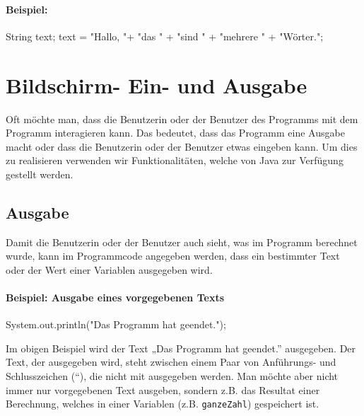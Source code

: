 \documentclass[10pt,paper=17cm:22cm, twoside=true, DIV=14]{scrbook}
\newenvironment {Shaded}
        {\begin{mdframed}[style=code] }
         {\end{mdframed}}
\newcommand{\StringTok}[1]{\textcolor[rgb]{0.4,0.4,0.4}{{#1}}}
\newcommand{\FunctionTok}[1]{\textcolor[rgb]{0.2,0.2,0.2}{#1}}
\newcommand{\NormalTok}[1]{#1}
\begin{document}
\paragraph{Beispiel:}\label{beispiel-18}

\begin{Shaded}
\begin{Highlighting}[]
\NormalTok{String text;}
\NormalTok{text = }\StringTok{"Hallo, "}\NormalTok{+ }\StringTok{"das "} \NormalTok{+ }\StringTok{"sind "} \NormalTok{+ }\StringTok{"mehrere "} \NormalTok{+ }\StringTok{"Wörter."}\NormalTok{;}
\end{Highlighting}
\end{Shaded}

\section{Bildschirm- Ein- und
Ausgabe}\label{bildschirm--ein--und-ausgabe-1}

Oft möchte man, dass die Benutzerin oder der Benutzer des Programms mit
dem Programm interagieren kann. Das bedeutet, dass das Programm eine
Ausgabe macht oder dass die Benutzerin oder der Benutzer etwas eingeben
kann. Um dies zu realisieren verwenden wir Funktionalitäten, welche von
Java zur Verfügung gestellt werden.

\subsection{Ausgabe}\label{ausgabe-1}

Damit die Benutzerin oder der Benutzer auch sieht, was im Programm
berechnet wurde, kann im Programmcode angegeben werden, dass ein
bestimmter Text oder der Wert einer Variablen ausgegeben wird.

\paragraph{Beispiel: Ausgabe eines vorgegebenen
Texts}\label{beispiel-ausgabe-eines-vorgegebenen-texts-1}

\begin{Shaded}
\begin{Highlighting}[]
\NormalTok{System.}\FunctionTok{out}\NormalTok{.}\FunctionTok{println}\NormalTok{(}\StringTok{"Das Programm hat geendet."}\NormalTok{);}
\end{Highlighting}
\end{Shaded}

Im obigen Beispiel wird der Text „Das Programm hat geendet.''
ausgegeben. Der Text, der ausgegeben wird, steht zwischen einem Paar von
Anführungs- und Schlusszeichen (``), die nicht mit ausgegeben werden.
Man möchte aber nicht immer nur vorgegebenen Text ausgeben, sondern z.B.
das Resultat einer Berechnung, welches in einer Variablen (z.B.
\texttt{ganzeZahl}) gespeichert ist.
\end{document}
